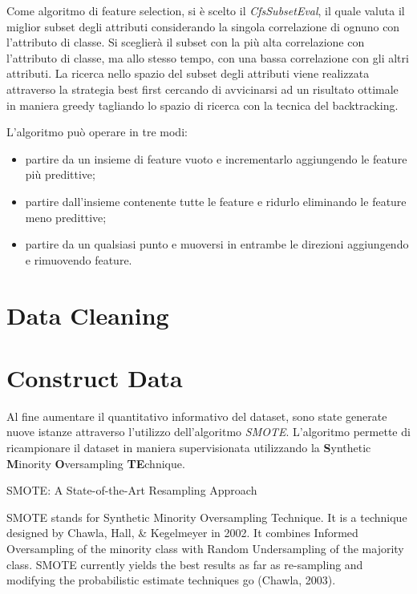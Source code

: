 Come algoritmo di feature selection, si è scelto il \textit{CfsSubsetEval}, il quale valuta il miglior subset degli attributi considerando la singola correlazione di ognuno con l'attributo di classe. Si sceglierà il subset con la più alta correlazione con l'attributo di classe, ma allo stesso tempo, con una bassa correlazione con gli altri attributi. La ricerca nello spazio del subset degli attributi viene realizzata attraverso la strategia best first cercando di avvicinarsi ad un risultato ottimale in maniera greedy tagliando lo spazio di ricerca con la tecnica del backtracking.\cite{Hall1998}

L'algoritmo può operare in tre modi:
\begin{itemize}
	\item partire da un insieme di feature vuoto e incrementarlo aggiungendo le feature più predittive;
	\item partire dall'insieme contenente tutte le feature e ridurlo eliminando le feature meno predittive;
	\item partire da un qualsiasi punto e muoversi in entrambe le direzioni aggiungendo e rimuovendo feature.
\end{itemize}

\section{Data Cleaning}

\section{Construct Data}

Al fine aumentare il quantitativo informativo del dataset, sono state generate nuove istanze attraverso l'utilizzo dell'algoritmo \textit{SMOTE}. L'algoritmo permette di ricampionare il dataset in maniera supervisionata utilizzando la \textbf{S}ynthetic \textbf{M}inority \textbf{O}versampling \textbf{TE}chnique. 
\cite{Chawla02smote:synthetic}


SMOTE: A State-of-the-Art Resampling Approach 

SMOTE stands for Synthetic Minority Oversampling Technique. 
It is a technique designed by Chawla, Hall, \& Kegelmeyer  in 2002.
It combines Informed Oversampling of the minority class with Random Undersampling        of the majority class.
SMOTE currently yields the best results as far as re-sampling and modifying the probabilistic estimate techniques go (Chawla, 2003).

